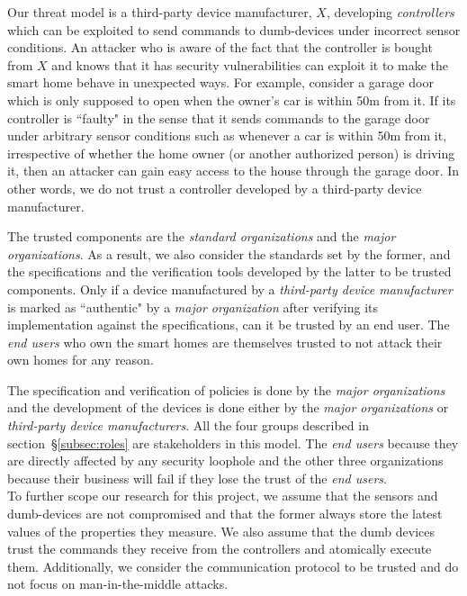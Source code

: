 \documentclass{article}
\begin{document}
Our threat model is a third-party device manufacturer, $X$, developing \textit{controllers} which can be exploited to send commands to dumb-devices under incorrect sensor conditions. An attacker who is aware of the fact that the controller is bought from $X$ and knows that it has security vulnerabilities can exploit it to make the smart home behave in unexpected ways. For example, consider a garage door which is only supposed to open when the owner's car is within 50m from it. If its controller is ``faulty" in the sense that it sends commands to the garage door under arbitrary sensor conditions such as whenever a car is within 50m from it, irrespective of whether the home owner (or another authorized person) is driving it, then an attacker can gain easy access to the house through the garage door. 
In other words, we do not trust a controller developed by a third-party device manufacturer. 

The trusted components are the \textit{standard organizations} and the \textit{major organizations}. As a result, we also consider the standards set by the former, and the specifications and the verification tools developed by the latter to be trusted components.
Only if a device manufactured by a \textit{third-party device manufacturer} is marked as ``authentic" by a \textit{major organization} after verifying its implementation against the specifications, can it be trusted by an end user. 
The \textit{end users} who own the smart homes are themselves trusted to not attack their own homes for any reason. 

The specification and verification of policies is done by the \textit{major organizations} and the development of the devices is done either by the \textit{major organizations} or \textit{third-party device manufacturers}. All the four groups described in section~\S\ref{subsec:roles} are stakeholders in this model. The \textit{end users} because they are directly affected by any security loophole and the other three organizations because their business will fail if they lose the trust of the \textit{end users}.\\ 

 To further scope our research for this project, we assume that the sensors and dumb-devices are not compromised and that the former always store the latest values of the properties they measure. We also assume that the dumb devices trust the commands they receive from the controllers and atomically execute them. Additionally, we consider the communication protocol to be trusted and do not focus on man-in-the-middle attacks. 
\end{document}
